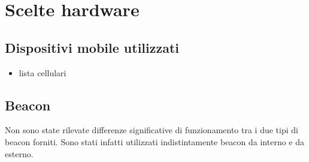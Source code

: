 \documentclass[../DocumentazioneDelloStudio.tex]{subfiles}
\begin{document}
\section{Scelte hardware}
	\subsection{Dispositivi mobile utilizzati}
	\begin{itemize}
		\item lista cellulari
	\end{itemize}

	\subsection{Beacon}
		Non sono state rilevate differenze significative di funzionamento tra i due tipi di beacon forniti. Sono stati infatti utilizzati indistintamente beacon da interno e da esterno.
\end{document}
